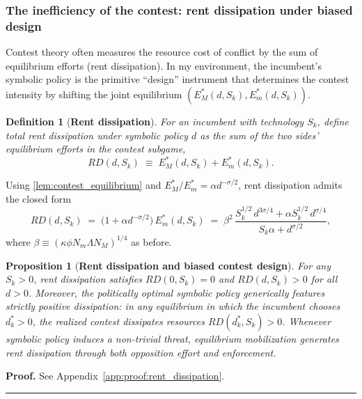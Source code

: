 \documentclass[11pt,twoside]{extarticle}
\newtheorem{definition}{Definition}
\newtheorem{proposition}{Proposition}
\newenvironment{proof}[1][Proof]{\noindent \textbf{#1.} }{\ \rule{0.5em}{0.5em}}
\begin{document}

\subsubsection{The inefficiency of the contest: rent dissipation under biased design}
Contest theory often measures the resource cost of conflict by the sum of equilibrium efforts (rent dissipation). In my environment, the incumbent's symbolic policy is the primitive ``design'' instrument that determines the contest intensity by shifting the joint equilibrium $(E_M^*(d,S_k),E_m^*(d,S_k))$.

\begin{definition}[\textbf{Rent dissipation}] \label{def:rent_dissipation}
For an incumbent with technology $S_k$, define total rent dissipation under symbolic policy $d$ as the sum of the two sides' equilibrium efforts in the contest subgame,
\begin{equation} \label{eq:RD}
RD(d,S_k)\;\equiv\;E_M^*(d,S_k)+E_m^*(d,S_k).
\end{equation}
\end{definition}

Using \autoref{lem:contest_equilibrium} and $E_M^*/E_m^*=\alpha d^{-\sigma/2}$, rent dissipation admits the closed form
\begin{equation} \label{eq:RD_closed_form}
RD(d,S_k)\;=\;\big(1+\alpha d^{-\sigma/2}\big)\,E_m^*(d,S_k)
\;=\;\beta^2\,\frac{S_k^{1/2}\,d^{3\sigma/4}+\alpha S_k^{1/2}\,d^{\sigma/4}}{S_k\alpha+d^{\sigma/2}},
\end{equation}
where $\beta\equiv(\kappa\phi N_m\Lambda N_M)^{1/4}$ as before.

\begin{proposition}[\textbf{Rent dissipation and biased contest design}] \label{prop:rent_dissipation}
For any $S_k>0$, rent dissipation satisfies $RD(0,S_k)=0$ and $RD(d,S_k)>0$ for all $d>0$. Moreover, the politically optimal symbolic policy generically features strictly positive dissipation: in any equilibrium in which the incumbent chooses $d_k^*>0$, the realized contest dissipates resources $RD(d_k^*,S_k)>0$.
Whenever symbolic policy induces a non-trivial threat, equilibrium mobilization generates rent dissipation through both opposition effort and enforcement.
\end{proposition}

\begin{proof}
See Appendix~\autoref{app:proof:rent_dissipation}.
\end{proof}
\end{document}

